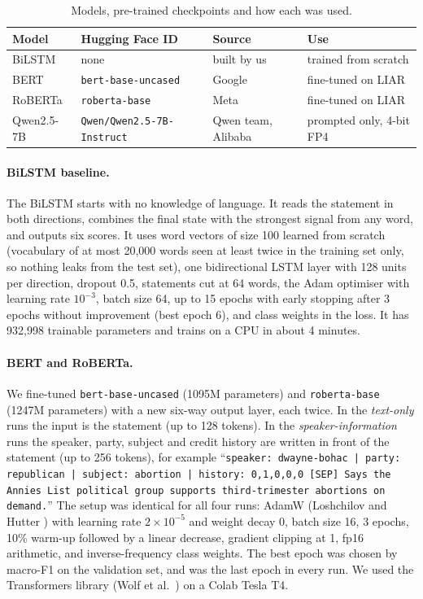\documentclass{nle}
\begin{document}
\begin{table}
\caption{Models, pre-trained checkpoints and how each was used.}
\begin{minipage}{\textwidth}
\begin{tabular}{llll}
\hline\hline
Model & Hugging Face ID & Source & Use \\
\hline
BiLSTM & none & built by us & trained from scratch \\
BERT & \texttt{bert-base-uncased} & Google & fine-tuned on LIAR \\
RoBERTa & \texttt{roberta-base} & Meta & fine-tuned on LIAR \\
Qwen2.5-7B & \texttt{Qwen/Qwen2.5-7B-Instruct} & Qwen team, Alibaba & prompted only, 4-bit FP4 \\
\hline\hline
\end{tabular}
\vspace{-1.5\baselineskip}
\end{minipage}
\label{tab:models}
\end{table}

\paragraph{BiLSTM baseline.} The BiLSTM starts with no knowledge of language. It reads the statement in both
directions, combines the final state with the strongest signal from any word, and outputs six scores. It uses
word vectors of size 100 learned from scratch (vocabulary of at most 20,000 words seen at least twice in the
training set only, so nothing leaks from the test set), one bidirectional LSTM layer with 128 units per
direction, dropout 0.5, statements cut at 64 words, the Adam optimiser with learning rate $10^{-3}$, batch size 64,
up to 15 epochs with early stopping after 3 epochs without improvement (best epoch 6), and class weights in the
loss. It has 932,998 trainable parameters and trains on a CPU in about 4 minutes.

\paragraph{BERT and RoBERTa.} We fine-tuned \texttt{bert-base-uncased} (109\hpt 5M parameters) and
\texttt{roberta-base} (124\hpt 7M parameters) with a new six-way output layer, each twice. In the
\emph{text-only} runs the input is the statement (up to 128 tokens). In the \emph{speaker-information} runs the speaker,
party, subject and credit history are written in front of the statement (up to 256 tokens), for example
``\texttt{speaker: dwayne-bohac | party: republican | subject: abortion | history: 0,1,0,0,0 [SEP] Says the
Annies List political group supports third-trimester abortions on demand.}'' The setup was identical for all four
runs: AdamW (Loshchilov and Hutter ) with learning rate $2\times 10^{-5}$ and weight
decay 0, batch size 16, 3 epochs, 10\% warm-up followed by a linear decrease, gradient clipping at 1,
fp16 arithmetic, and inverse-frequency class weights. The best epoch was chosen by macro-F1 on the validation
set, and was the last epoch in every run. We used the Transformers library (Wolf et al.\ ) on a
Colab Tesla T4.
\end{document}
